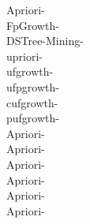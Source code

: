 Apriori-~\cite{apriori}\\
FpGrowth-~\cite{fpgrowth}\\
DSTree-Mining-~\cite{dstree}\\
upriori-~\cite{upriori}\\
ufgrowth-~\cite{ufgrowth}\\
ufpgrowth-~\cite{ufpgrowth}\\
cufgrowth-~\cite{cufgrowth}\\
pufgrowth-~\cite{pufgrowth}\\
Apriori-~\cite{apriori}\\
Apriori-~\cite{apriori}\\
Apriori-~\cite{apriori}\\
Apriori-~\cite{apriori}\\
Apriori-~\cite{apriori}\\
Apriori-~\cite{apriori}\\
